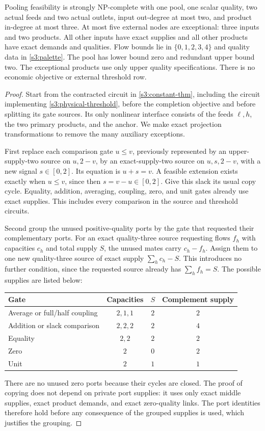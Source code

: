 \begin{theorem}\label{s3:five-thm}
Pooling feasibility is strongly NP-complete with one pool, one scalar
quality, two actual feeds and two actual outlets, input out-degree at
most two, and product in-degree at most three. At most five external
nodes are exceptional: three inputs and two products. All other inputs
have exact supplies and all other products have exact demands and
qualities. Flow bounds lie in $\{0,1,2,3,4\}$ and quality data in
\eqref{s3:palette}. The pool has lower bound zero and redundant upper
bound two. The exceptional products use only upper quality specifications.
There is no economic objective or external threshold row.
\end{theorem}
\begin{proof}
Start from the contracted circuit in \cref{s3:constant-thm}, including
the circuit implementing \eqref{s3:physical-threshold}, before the
completion objective and before splitting its gate sources. Its only
nonlinear interface consists of the feeds $\ell,h$, the two primary
products, and the anchor. We make exact projection transformations to
remove the many auxiliary exceptions.

First replace each comparison gate $u\le v$, previously represented by
an upper-supply-two source on $u,2-v$, by an exact-supply-two source on
$u,s,2-v$, with a new signal $s\in[0,2]$. Its equation is $u+s=v$.
A feasible extension exists exactly when $u\le v$, since then
$s=v-u\in[0,2]$. Give this slack its usual copy cycle. Equality,
addition, averaging, coupling, zero, and unit gates already use exact
supplies. This includes every comparison in the source and threshold
circuits.

Second group the unused positive-quality ports by the gate that requested
their complementary ports. For an exact quality-three source requesting
flows $f_h$ with capacities $c_h$ and total supply $S$, the unused mates
carry $c_h-f_h$. Assign them to one new quality-three source of exact
supply $\sum_hc_h-S$. This introduces no further condition, since the
requested source already has $\sum_hf_h=S$. The possible supplies are
listed below:
\begin{center}
\begin{tabular}{lccc}
\toprule
Gate & Capacities & $S$ & Complement supply\\
\midrule
Average or full/half coupling & $2,1,1$ & $2$ & $2$\\
Addition or slack comparison & $2,2,2$ & $2$ & $4$\\
Equality & $2,2$ & $2$ & $2$\\
Zero & $2$ & $0$ & $2$\\
Unit & $2$ & $1$ & $1$\\
\bottomrule
\end{tabular}
\end{center}
There are no unused zero ports because their cycles are closed. The
proof of copying does not depend on private port supplies: it uses only
exact middle supplies, exact product demands, and exact zero-quality
links. The port identities therefore hold before any consequence of the
grouped supplies is used, which justifies the grouping.


\end{proof}
